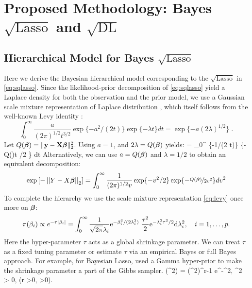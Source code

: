 \documentclass[ba]{imsart}
\def\sql{$\sqrt{\text{Lasso}}$}
\begin{document}

\section{Proposed Methodology: Bayes \texorpdfstring{$\sqrt{\text{Lasso}}$}{Square-root Lasso} and \texorpdfstring{$\sqrt{\text{DL}}$}{Square-root DL}}\label{ch:2}
\subsection{Hierarchical Model for Bayes \sql{}}
Here we derive the Bayesian hierarchical model corresponding to the $\sqrt{\text{Lasso}}$ in \eqref{eq:sqlasso}. Since the likelihood-prior decomposition of \eqref{eq:sqlasso} yield a Laplace density for both the observation and the prior model, we use a Gaussian scale mixture representation of Laplace distribution \citep{andrews_scale_1974}, which itself follows from the well-known Levy identity \citep{levy1940certains}:
\begin{equation}
  \int_{0}^{\infty} \frac{a}{(2 \pi)^{1/2} t^{3/2}} \exp\{-{a^2}/({2 t})\} \exp\{-\lambda t\} dt = \exp\{-a (2 \lambda)^{1/2} \} \;.\label{eq:levy}
\end{equation}
Let $Q(\boldsymbol{\beta})= \lVert{\bf y} - {\bf X} \boldsymbol{\beta}\rVert_2^2$. Using $a = 1$, and $2\lambda = Q(\boldsymbol{\beta})$ yields:
\beq
\exp {} = \int_{0}^{\infty}  \exp\{-{1}/({2 t})\} \exp\{-Q(\bbeta)t /2 \} dt \label{eq:t_i}
\eeq
Alternatively, we can use $a = Q(\boldsymbol{\beta})$ and $\lambda = 1/2$ to obtain an equivalent decomposition:
\begin{equation}
\exp \left[-\left|\left|Y - X\boldsymbol{\beta}\right|\right|_2 \right] = \int_{0}^{\infty} \frac{1}{(2 \pi)^{1/2} v} \exp\{-{v^2}/{2}\} \exp\{- \nicefrac{Q(\boldsymbol{\beta})}{2v^2}\} dv^2 \label{eq:v_i}
\end{equation}
To complete the hierarchy we use the scale mixture representation \eqref{eq:levy} once more on $\boldsymbol{\beta}$:
\[
\pi(\beta_i) \propto e^{-\tau \lvert\beta_i\rvert} = \int_{0}^{\infty} \frac{1}{\sqrt{2\pi} \lambda_i} {\rm e}^{-\beta_i^2/(2\lambda_i^2)} \; \frac{\tau^2}{2} {\rm e}^{-\lambda_i^2\tau^2/2} {\rm d} \lambda_i^2, \quad i = 1, \ldots, p.
\]
Here the hyper-parameter $\tau$ acts as a global shrinkage parameter. We can treat $\tau$ as a fixed tuning parameter or estimate $\tau$ via an empirical Bayes or full Bayes approach. For example, for Bayesian Lasso, \cite{park_bayesian_2008} used a Gamma hyper-prior to make the shrinkage parameter a part of the Gibbs sampler. 
\beq
\pi(\tau^2) =  (\tau^2)^{r-1} e^{-\delta \tau^2}, \; \tau^2 > 0, \; (r >0, \delta >0).
\end{document}
